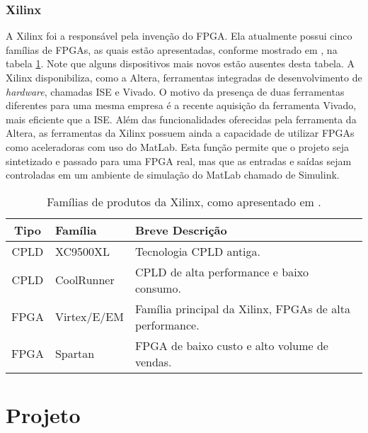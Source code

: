\documentclass[11pt,a4paper,oneside]{book}
\begin{document}

\subsubsection{Xilinx}
A Xilinx foi a respons\'avel pela inven\c{c}\~ao do FPGA.
Ela atualmente possui cinco fam\'i­lias de FPGAs, as quais est\~ao apresentadas, conforme mostrado em \cite{Woods2008}, na tabela \ref{tab:xilinx}.
Note que alguns dispositivos mais novos est\~ao ausentes desta tabela.
A Xilinx disponibiliza, como a Altera, ferramentas integradas de desenvolvimento de \textit{hardware}, chamadas ISE e Vivado.
O motivo da presen\c{c}a de duas ferramentas diferentes para uma mesma empresa \'e a recente aquisi\c{c}\~ao da ferramenta Vivado, mais eficiente que a ISE.
Al\'em das funcionalidades oferecidas pela ferramenta da Altera, as ferramentas da Xilinx possuem ainda a capacidade de utilizar FPGAs como aceleradoras com uso do MatLab.
Esta fun\c{c}\~ao permite que o projeto seja sintetizado e passado para uma FPGA real, mas que as entradas e sa\'i­das sejam controladas em um ambiente de simula\c{c}\~ao do MatLab chamado de Simulink.

\begin{table}[h]
\centering
\begin{tabular}{|c|l|p{6.5cm}|}
\hline
Tipo & Fam\'i­lia & Breve Descri\c{c}\~ao \\ \hline
CPLD & XC9500XL & Tecnologia CPLD antiga. \\ \hline
CPLD & CoolRunner & CPLD de alta performance e baixo consumo. \\ \hline
FPGA & Virtex/E/EM & Fam\'i­lia principal da Xilinx, FPGAs de alta performance. \\ \hline
FPGA & Spartan & FPGA de baixo custo e alto volume de vendas. \\ \hline
\end{tabular}
\caption{Fam\'i­lias de produtos da Xilinx, como apresentado em \cite{Woods2008}.}
\label{tab:xilinx}
\end{table}


\section{Projeto}
\label{sec:projeto}
\end{document}
